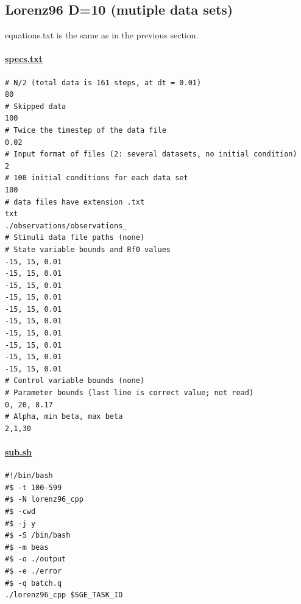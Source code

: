 \documentclass[11pt]{article}
\begin{document}
{\clearpage


\subsection{Lorenz96 D=10 (mutiple data sets)}

equations.txt is the same as in the previous section.

\paragraph{\underline{specs.txt}}
\begin{verbatim}
# N/2 (total data is 161 steps, at dt = 0.01)
80
# Skipped data 
100
# Twice the timestep of the data file
0.02
# Input format of files (2: several datasets, no initial condition)
2
# 100 initial conditions for each data set
100
# data files have extension .txt
txt
./observations/observations_
# Stimuli data file paths (none)
# State variable bounds and Rf0 values
-15, 15, 0.01
-15, 15, 0.01
-15, 15, 0.01
-15, 15, 0.01
-15, 15, 0.01
-15, 15, 0.01
-15, 15, 0.01
-15, 15, 0.01
-15, 15, 0.01
-15, 15, 0.01
# Control variable bounds (none)
# Parameter bounds (last line is correct value; not read)
0, 20, 8.17
# Alpha, min beta, max beta
2,1,30
\end{verbatim}

\paragraph{\underline{sub.sh}}

\begin{verbatim}
#!/bin/bash
#$ -t 100-599
#$ -N lorenz96_cpp
#$ -cwd
#$ -j y
#$ -S /bin/bash
#$ -m beas
#$ -o ./output
#$ -e ./error
#$ -q batch.q
./lorenz96_cpp $SGE_TASK_ID
\end{verbatim}


}
\end{document}
